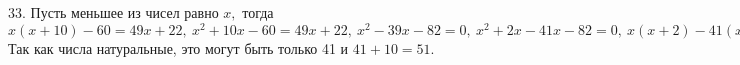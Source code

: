33. Пусть меньшее из чисел равно $x,$ тогда $x(x+10)-60=49x+22,\ x^2+10x-60=49x+22,\ x^2-39x-82=0,\ x^2+2x-41x-82=0,\ x(x+2)-41(x+2)=0,\ (x-41)(x+2)=0.$ Так как
числа натуральные, это могут быть только 41 и $41+10=51.$\\
